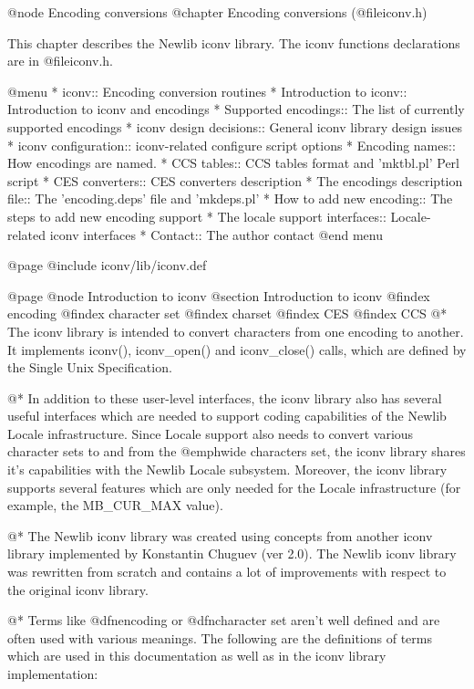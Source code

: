 @node Encoding conversions
@chapter Encoding conversions (@file{iconv.h})

This chapter describes the Newlib iconv library.
The iconv functions declarations are in
@file{iconv.h}.

@menu
* iconv::                           Encoding conversion routines
* Introduction to iconv::           Introduction to iconv and encodings
* Supported encodings::             The list of currently supported encodings
* iconv design decisions::          General iconv library design issues
* iconv configuration::             iconv-related configure script options
* Encoding names::                  How encodings are named.
* CCS tables::                      CCS tables format and 'mktbl.pl' Perl script
* CES converters::                  CES converters description
* The encodings description file::  The 'encoding.deps' file and 'mkdeps.pl'
* How to add new encoding::         The steps to add new encoding support
* The locale support interfaces::   Locale-related iconv interfaces
* Contact::                         The author contact
@end menu

@page
@include iconv/lib/iconv.def

@page
@node Introduction to iconv
@section Introduction to iconv
@findex encoding
@findex character set
@findex charset
@findex CES
@findex CCS
@*
The iconv library is intended to convert characters from one encoding to
another. It implements iconv(), iconv_open() and iconv_close()
calls, which are defined by the Single Unix Specification.

@*
In addition to these user-level interfaces, the iconv library also has
several useful interfaces which are needed to support coding
capabilities of the Newlib Locale infrastructure.  Since Locale 
support also needs to
convert various character sets to and from the @emph{wide characters
set}, the iconv library shares it's capabilities with the Newlib Locale
subsystem. Moreover, the iconv library supports several features which are
only needed for the Locale infrastructure (for example, the MB_CUR_MAX value).

@*
The Newlib iconv library was created using concepts from another iconv
library implemented by Konstantin Chuguev (ver 2.0). The Newlib iconv library
was rewritten from scratch and contains a lot of improvements with respect to
the original iconv library. 

@*
Terms like @dfn{encoding} or @dfn{character set} aren't well defined and
are often used with various meanings. The following are the definitions of terms
which are used in this documentation as well as in the iconv library
implementation:

